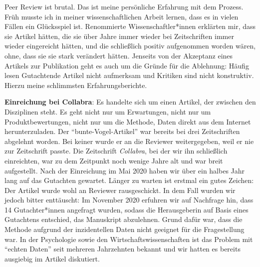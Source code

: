 \documentclass[
  letterpaper,
  DIV=11,
  numbers=noendperiod]{scrreprt}
\begin{document}
\begin{tcolorbox}[enhanced jigsaw, left=2mm, colback=white, colframe=quarto-callout-note-color-frame, opacitybacktitle=0.6, opacityback=0, title=\textcolor{quarto-callout-note-color}{\faInfo}\hspace{0.5em}{Anekdoten: Meine schlimmsten Erfahrungen mit Peer Review}, toptitle=1mm, coltitle=black, colbacktitle=quarto-callout-note-color!10!white, titlerule=0mm, bottomtitle=1mm, leftrule=.75mm, breakable, rightrule=.15mm, bottomrule=.15mm, toprule=.15mm, arc=.35mm]

Peer Review ist brutal. Das ist meine persönliche Erfahrung mit dem
Prozess. Früh musste ich in meiner wissenschaftlichen Arbeit lernen,
dass es in vielen Fällen ein Glücksspiel ist. Renommierte
Wissenschaftler*innen erklärten mir, dass sie Artikel hätten, die sie
über Jahre immer wieder bei Zeitschriften immer wieder eingereicht
hätten, und die schließlich positiv aufgenommen worden wären, ohne, dass
sie sie stark verändert hätten. Jenseits von der Akzeptanz eines
Artikels zur Publikation geht es auch um die Gründe für die Ablehnung:
Häufig lesen Gutachtende Artikel nicht aufmerksam und Kritiken sind
nicht konstruktiv. Hierzu meine schlimmsten Erfahrungsberichte.

\textbf{Einreichung bei Collabra}: Es handelte sich um einen Artikel,
der zwischen den Disziplinen steht. Es geht nicht nur um Erwartungen,
nicht nur um Produktbewertungen, nicht nur um die Methode, Daten direkt
aus dem Internet herunterzuladen. Der ``bunte-Vogel-Artikel'' war
bereits bei drei Zeitschriften abgelehnt worden. Bei keiner wurde er an
die Reviewer weitergegeben, weil er nie zur Zeitschrift passte. Die
Zeitschrift \emph{Collabra}, bei der wir ihn schließlich einreichten,
war zu dem Zeitpunkt noch wenige Jahre alt und war breit aufgestellt.
Nach der Einreichung im Mai 2020 haben wir über ein halbes Jahr lang auf
das Gutachten gewartet. Länger zu warten ist erstmal ein gutes Zeichen:
Der Artikel wurde wohl an Reviewer rausgeschickt. In dem Fall wurden wir
jedoch bitter enttäuscht: Im November 2020 erfuhren wir auf Nachfrage
hin, dass 14 Gutachter*innen angefragt wurden, sodass die Herausgeberin
auf Basis eines Gutachtens entschied, das Manuskript abzulehnen. Grund
dafür war, dass die Methode aufgrund der inzidentellen Daten nicht
geeignet für die Fragestellung war. In der Psychologie sowie den
Wirtschaftswissenschaften ist das Problem mit ``echten Daten'' seit
mehreren Jahrzehnten bekannt und wir hatten es bereits ausgiebig im
Artikel diskutiert.


\end{tcolorbox}
\end{document}
